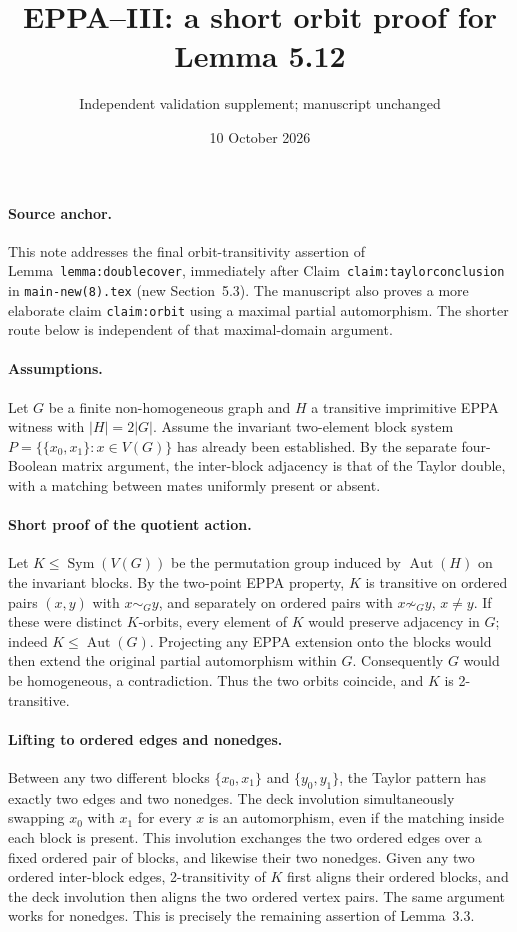 \documentclass[11pt,a4paper]{article}
\title{EPPA--III: a short orbit proof for Lemma 5.12}
\author{Independent validation supplement; manuscript unchanged}
\date{10 October 2026}
\begin{document}
\maketitle

\paragraph{Source anchor.}
This note addresses the final orbit-transitivity assertion
of Lemma~\texttt{lemma:doublecover}, immediately after
Claim~\texttt{claim:taylorconclusion} in
\texttt{main-new(8).tex} (new Section~5.3).
The manuscript also proves a more elaborate claim
\texttt{claim:orbit} using a maximal partial
automorphism. The shorter route below is independent
of that maximal-domain argument.

\paragraph{Assumptions.}
Let \(G\) be a finite non-homogeneous graph and
\(H\) a transitive imprimitive EPPA witness with
\(|H|=2|G|\).
Assume the invariant two-element block system
\(P=\{\{x_0,x_1\}:x\in V(G)\}\) has already been
established. By the separate four-Boolean
matrix argument, the inter-block adjacency is
that of the Taylor double, with a matching
between mates uniformly present or absent.

\paragraph{Short proof of the quotient action.}
Let \(K\le \operatorname{Sym}(V(G))\) be the
permutation group induced by \(\operatorname{Aut}(H)\)
on the invariant blocks. By the two-point EPPA
property, \(K\) is transitive on ordered pairs
\((x,y)\) with \(x\sim_G y\), and separately on
ordered pairs with \(x\not\sim_G y\), \(x\ne y\).
If these were distinct \(K\)-orbits, every
element of \(K\) would preserve adjacency in
\(G\); indeed \(K\le \operatorname{Aut}(G)\).
Projecting any EPPA extension onto the blocks
would then extend the original partial
automorphism within \(G\). Consequently \(G\)
would be homogeneous, a contradiction.
Thus the two orbits coincide, and \(K\)
is 2-transitive.

\paragraph{Lifting to ordered edges and nonedges.}
Between any two different blocks \(\{x_0,x_1\}\)
and \(\{y_0,y_1\}\), the Taylor pattern has
exactly two edges and two nonedges.
The deck involution simultaneously swapping
\(x_0\) with \(x_1\) for every \(x\) is an
automorphism, even if the matching inside
each block is present. This involution
exchanges the two ordered edges over a fixed
ordered pair of blocks, and likewise their
two nonedges.
Given any two ordered inter-block edges,
2-transitivity of \(K\) first aligns their
ordered blocks, and the deck involution
then aligns the two ordered vertex pairs.
The same argument works for nonedges.
This is precisely the remaining assertion
of Lemma~3.3.
\end{document}
